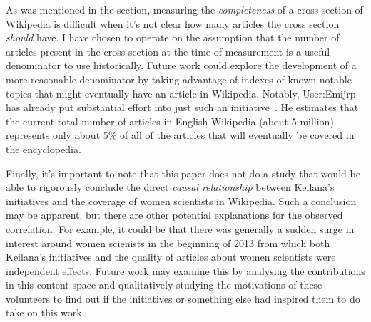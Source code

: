 As was mentioned in the  section, measuring the \emph{completeness} of a cross section of Wikipedia is difficult when it's not clear how many articles the cross section \emph{should} have.  I have chosen to operate on the assumption that the number of articles present in the cross section at the time of measurement is a useful denominator to use historically.  Future work could explore the development of a more reasonable denominator by taking advantage of indexes of known notable topics that might eventually have an article in Wikipedia.  Notably, User:Emijrp has already put substantial effort into just such an initiative~\cite{emijrp17all}.  He estimates that the current total number of articles in English Wikipedia (about 5 million) represents only about 5\% of all of the articles that will eventually be covered in the encyclopedia.

Finally, it's important to note that this paper does not do a study that would be able to rigorously conclude the direct \emph{causal relationship} between Keilana's initiatives and the coverage of women scientists in Wikipedia.  Such a conclusion may be apparent, but there are other potential explanations for the observed correlation.  For example, it could be that there was generally a sudden surge in interest around women scienists in the beginning of 2013 from which both Keilana's initiatives and the quality of articles about women scientists were independent effects.  Future work may examine this by analysing the contributions in this content space and qualitatively studying the motivations of these volunteers to find out if the initiatives or something else had inspired them to do take on this work.
